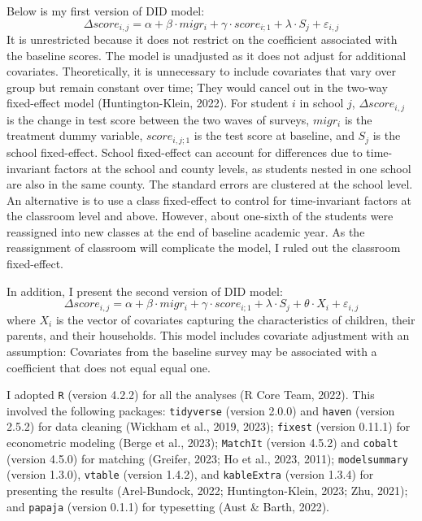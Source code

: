 \documentclass[
  man,floatsintext]{apa7}
\begin{document}
Below is my first version of DID model: \[\Delta score_{i,j} = \alpha + \beta \cdot migr_{i} + \gamma \cdot score_{i;1} + \lambda \cdot S_{j} + \varepsilon_{i,j}\] It is unrestricted because it does not restrict on the coefficient associated with the baseline scores. The model is unadjusted as it does not adjust for additional covariates. Theoretically, it is unnecessary to include covariates that vary over group but remain constant over time; They would cancel out in the two-way fixed-effect model (Huntington-Klein, 2022). For student \(i\) in school \(j\), \(\Delta score_{i,j}\) is the change in test score between the two waves of surveys, \(migr_{i}\) is the treatment dummy variable, \(score_{i,j;1}\) is the test score at baseline, and \(S_{j}\) is the school fixed-effect. School fixed-effect can account for differences due to time-invariant factors at the school and county levels, as students nested in one school are also in the same county. The standard errors are clustered at the school level. An alternative is to use a class fixed-effect to control for time-invariant factors at the classroom level and above. However, about one-sixth of the students were reassigned into new classes at the end of baseline academic year. As the reassignment of classroom will complicate the model, I ruled out the classroom fixed-effect.

In addition, I present the second version of DID model: \[\Delta score_{i,j} = \alpha + \beta \cdot migr_{i} + \gamma \cdot score_{i;1} + \lambda \cdot S_{j} + \theta \cdot X_{i} + \varepsilon_{i,j}\] where \(X_{i}\) is the vector of covariates capturing the characteristics of children, their parents, and their households. This model includes covariate adjustment with an assumption: Covariates from the baseline survey may be associated with a coefficient that does not equal equal one.

I adopted \texttt{R} (version 4.2.2) for all the analyses (R Core Team, 2022). This involved the following packages: \texttt{tidyverse} (version 2.0.0) and \texttt{haven} (version 2.5.2) for data cleaning (Wickham et al., 2019, 2023); \texttt{fixest} (version 0.11.1) for econometric modeling (Berge et al., 2023); \texttt{MatchIt} (version 4.5.2) and \texttt{cobalt} (version 4.5.0) for matching (Greifer, 2023; Ho et al., 2023, 2011); \texttt{modelsummary} (version 1.3.0), \texttt{vtable} (version 1.4.2), and \texttt{kableExtra} (version 1.3.4) for presenting the results (Arel-Bundock, 2022; Huntington-Klein, 2023; Zhu, 2021); and \texttt{papaja} (version 0.1.1) for typesetting (Aust \& Barth, 2022).
\end{document}
